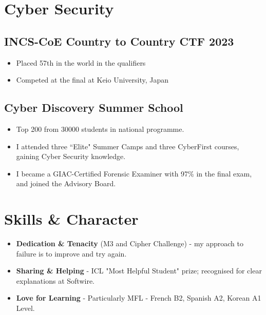 \documentclass{Resume}
\begin{document}
    \section{Cyber Security}
            \subsection{INCS-CoE Country to Country CTF 2023}
            \begin{itemize}
                \item Placed 57th in the world in the qualifiers
                \item Competed at the final at Keio University, Japan
            \end{itemize}
		\subsection{Cyber Discovery Summer School}
				\begin{itemize}
				    \item Top 200 from 30000 students in national programme.
				    \item I attended three ``Elite" Summer Camps and three CyberFirst courses, gaining Cyber Security knowledge.
				    \item I became a GIAC-Certified Forensic Examiner with 97\% in the final exam, and joined the Advisory Board.
				\end{itemize}

    \section{Skills \& Character}
        \begin{itemize}
            \item \textbf{Dedication \& Tenacity} (M3 and Cipher Challenge) - my approach to failure is to improve and try again.
            \item \textbf{Sharing \& Helping} - ICL "Most Helpful Student" prize; recognised for clear explanations at Softwire.
            \item \textbf{Love for Learning} - Particularly MFL - French B2, Spanish A2, Korean A1 Level.
        \end{itemize}
        
\end{document}
